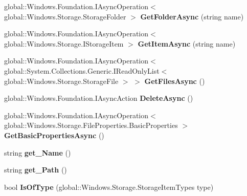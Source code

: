 \begin{DoxyCompactItemize}
global\+::\+Windows.\+Foundation.\+I\+Async\+Operation$<$ global\+::\+Windows.\+Storage.\+Storage\+Folder $>$ {\bfseries Get\+Folder\+Async} (string name)
\item 
\mbox{\label{class_windows_1_1_storage_1_1_storage_folder_ac931af40aac04b2aff19610399dbae2e}} 
global\+::\+Windows.\+Foundation.\+I\+Async\+Operation$<$ global\+::\+Windows.\+Storage.\+I\+Storage\+Item $>$ {\bfseries Get\+Item\+Async} (string name)
\item 
\mbox{\label{class_windows_1_1_storage_1_1_storage_folder_a03d5948527bd8ff44b485ba99e4fd723}} 
global\+::\+Windows.\+Foundation.\+I\+Async\+Operation$<$ global\+::\+System.\+Collections.\+Generic.\+I\+Read\+Only\+List$<$ global\+::\+Windows.\+Storage.\+Storage\+File $>$ $>$ {\bfseries Get\+Files\+Async} ()
\item 
\mbox{\label{class_windows_1_1_storage_1_1_storage_folder_ae60237b6aa50f6820009b4332c8abd48}} 
global\+::\+Windows.\+Foundation.\+I\+Async\+Action {\bfseries Delete\+Async} ()
\item 
\mbox{\label{class_windows_1_1_storage_1_1_storage_folder_ae9c02355139ce9e4530065b3ddfb717f}} 
global\+::\+Windows.\+Foundation.\+I\+Async\+Operation$<$ global\+::\+Windows.\+Storage.\+File\+Properties.\+Basic\+Properties $>$ {\bfseries Get\+Basic\+Properties\+Async} ()
\item 
\mbox{\label{class_windows_1_1_storage_1_1_storage_folder_a722592bfe76cdbc6678e09dca477b4fc}} 
string {\bfseries get\+\_\+\+Name} ()
\item 
\mbox{\label{class_windows_1_1_storage_1_1_storage_folder_a3c76cae5d410f07ee9f03d979f1b81f8}} 
string {\bfseries get\+\_\+\+Path} ()
\item 
\mbox{\label{class_windows_1_1_storage_1_1_storage_folder_aa385666b1143c539c3b9d8bbb270e8d1}} 
bool {\bfseries Is\+Of\+Type} (global\+::\+Windows.\+Storage.\+Storage\+Item\+Types type)
\item 

\end{DoxyCompactItemize}
